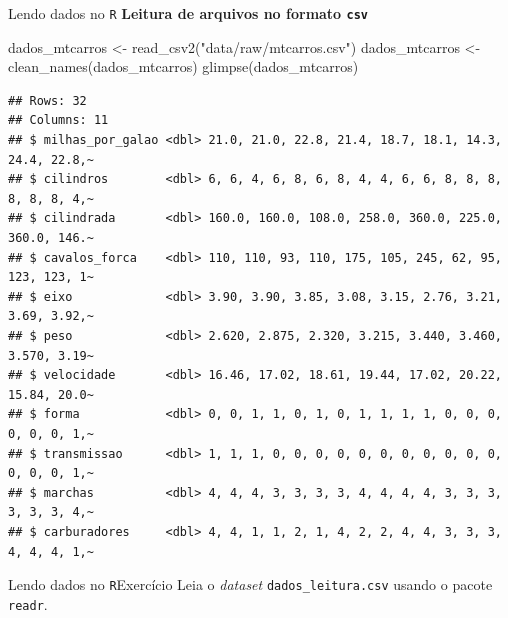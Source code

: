 \documentclass[
  10pt,
  ignorenonframetext,
]{beamer}
\newenvironment{Shaded}{}{}
\newcommand{\KeywordTok}[1]{\textcolor[rgb]{0.00,0.00,1.00}{#1}}
\newcommand{\NormalTok}[1]{#1}
\newcommand{\StringTok}[1]{\textcolor[rgb]{0.00,0.50,0.50}{#1}}
\begin{document}
\begin{frame}[fragile]{Lendo dados no \texttt{R}}
\protect\hypertarget{lendo-dados-no-r-3}{}
\textbf{Leitura de arquivos no formato \texttt{csv}}

\begin{Shaded}
\begin{Highlighting}[]
\NormalTok{dados\_mtcarros \textless{}{-}}\StringTok{ }\KeywordTok{read\_csv2}\NormalTok{(}\StringTok{"data/raw/mtcarros.csv"}\NormalTok{)}
\NormalTok{dados\_mtcarros \textless{}{-}}\StringTok{ }\KeywordTok{clean\_names}\NormalTok{(dados\_mtcarros)}
\KeywordTok{glimpse}\NormalTok{(dados\_mtcarros)}
\end{Highlighting}
\end{Shaded}

\begin{verbatim}
## Rows: 32
## Columns: 11
## $ milhas_por_galao <dbl> 21.0, 21.0, 22.8, 21.4, 18.7, 18.1, 14.3, 24.4, 22.8,~
## $ cilindros        <dbl> 6, 6, 4, 6, 8, 6, 8, 4, 4, 6, 6, 8, 8, 8, 8, 8, 8, 4,~
## $ cilindrada       <dbl> 160.0, 160.0, 108.0, 258.0, 360.0, 225.0, 360.0, 146.~
## $ cavalos_forca    <dbl> 110, 110, 93, 110, 175, 105, 245, 62, 95, 123, 123, 1~
## $ eixo             <dbl> 3.90, 3.90, 3.85, 3.08, 3.15, 2.76, 3.21, 3.69, 3.92,~
## $ peso             <dbl> 2.620, 2.875, 2.320, 3.215, 3.440, 3.460, 3.570, 3.19~
## $ velocidade       <dbl> 16.46, 17.02, 18.61, 19.44, 17.02, 20.22, 15.84, 20.0~
## $ forma            <dbl> 0, 0, 1, 1, 0, 1, 0, 1, 1, 1, 1, 0, 0, 0, 0, 0, 0, 1,~
## $ transmissao      <dbl> 1, 1, 1, 0, 0, 0, 0, 0, 0, 0, 0, 0, 0, 0, 0, 0, 0, 1,~
## $ marchas          <dbl> 4, 4, 4, 3, 3, 3, 3, 4, 4, 4, 4, 3, 3, 3, 3, 3, 3, 4,~
## $ carburadores     <dbl> 4, 4, 1, 1, 2, 1, 4, 2, 2, 4, 4, 3, 3, 3, 4, 4, 4, 1,~
\end{verbatim}
\end{frame}

\begin{frame}[fragile]{Lendo dados no \texttt{R}\newline Exercício}
\protect\hypertarget{lendo-dados-no-rexercuxedcio-1}{}
Leia o \emph{dataset} \texttt{dados\_leitura.csv} usando o pacote
\texttt{readr}.
\end{frame}
\end{document}
